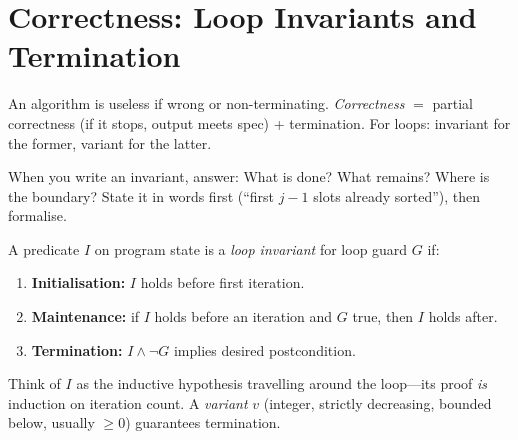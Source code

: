 \section{Correctness: Loop Invariants and Termination}
\label{sec:invariants}
An algorithm is useless if wrong or non-terminating. \emph{Correctness} $=$ partial correctness (if it stops, output meets spec) + termination. For loops: invariant for the former, variant for the latter.
\begin{remark} When you write an invariant, answer: What is done? What remains? Where is the boundary? State it in words first (``first $j-1$ slots already sorted''), then formalise. \end{remark}
\begin{center}
\end{center}
\begin{definition}
A predicate $I$ on program state is a \emph{loop invariant} for loop guard $G$ if:
\begin{enumerate}[label=(LI\arabic*)]
    \item \textbf{Initialisation:} $I$ holds before first iteration.
    \item \textbf{Maintenance:} if $I$ holds before an iteration and $G$ true, then $I$ holds after.
    \item \textbf{Termination:} $I\land\neg G$ implies desired postcondition.
\end{enumerate}
\end{definition}
Think of $I$ as the inductive hypothesis travelling around the loop---its proof \emph{is} induction on iteration count. A \emph{variant} $v$ (integer, strictly decreasing, bounded below, usually $\ge0$) guarantees termination.
